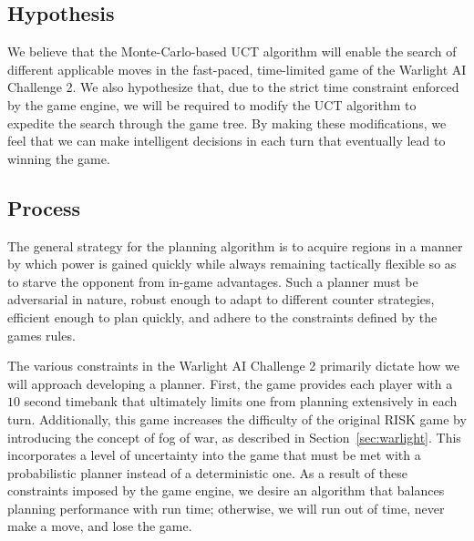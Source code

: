\documentclass[a4paper,11pt]{article}
\begin{document}
\subsection{Hypothesis}\label{sec:hypothesis}
We believe that the Monte-Carlo-based UCT algorithm will enable the search of different applicable moves in the fast-paced, time-limited game of the Warlight AI Challenge 2. We also hypothesize that, due to the strict time constraint enforced by the game engine, we will be required to modify the UCT algorithm to expedite the search through the game tree.  By making these modifications, we feel that we can make intelligent decisions in each turn that eventually lead to winning the game.

\subsection{Process}\label{sec:process}
The general strategy for the planning algorithm is to acquire regions in a manner by which power is gained quickly while always remaining tactically flexible so as to starve the opponent from in-game advantages. Such a planner must be adversarial in nature, robust enough to adapt to different counter strategies, efficient enough to plan quickly, and adhere to the constraints defined by the games rules.

The various constraints in the Warlight AI Challenge 2 primarily dictate how we will approach developing a planner. First, the game provides each player with a $10$ second timebank that ultimately limits one from planning extensively in each turn.  Additionally, this game increases the difficulty of the original RISK game by introducing the concept of fog of war, as described in Section~\ref{sec:warlight}. This incorporates a level of uncertainty into the game that must be met with a probabilistic planner instead of a deterministic one. As a result of these constraints imposed by the game engine, we desire an algorithm that balances planning performance with run time; otherwise, we will run out of time, never make a move, and lose the game. 
\end{document}
